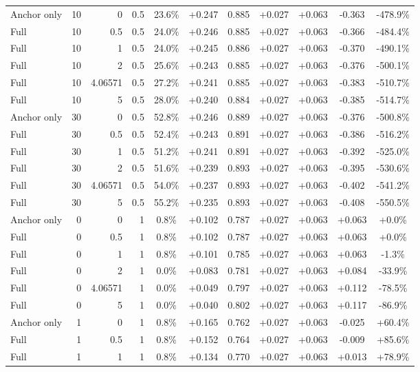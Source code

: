\begin{table}[htbp]
\begin{tabular}{lrrrccccccc}
Anchor only & 10 & 0 & 0.5 & 23.6\% & +0.247 & 0.885 & +0.027 & +0.063 & -0.363 & -478.9\% \\
Full & 10 & 0.5 & 0.5 & 24.0\% & +0.246 & 0.885 & +0.027 & +0.063 & -0.366 & -484.4\% \\
Full & 10 & 1 & 0.5 & 24.0\% & +0.245 & 0.886 & +0.027 & +0.063 & -0.370 & -490.1\% \\
Full & 10 & 2 & 0.5 & 25.6\% & +0.243 & 0.885 & +0.027 & +0.063 & -0.376 & -500.1\% \\
Full & 10 & 4.06571 & 0.5 & 27.2\% & +0.241 & 0.885 & +0.027 & +0.063 & -0.383 & -510.7\% \\
Full & 10 & 5 & 0.5 & 28.0\% & +0.240 & 0.884 & +0.027 & +0.063 & -0.385 & -514.7\% \\
Anchor only & 30 & 0 & 0.5 & 52.8\% & +0.246 & 0.889 & +0.027 & +0.063 & -0.376 & -500.8\% \\
Full & 30 & 0.5 & 0.5 & 52.4\% & +0.243 & 0.891 & +0.027 & +0.063 & -0.386 & -516.2\% \\
Full & 30 & 1 & 0.5 & 51.2\% & +0.241 & 0.891 & +0.027 & +0.063 & -0.392 & -525.0\% \\
Full & 30 & 2 & 0.5 & 51.6\% & +0.239 & 0.893 & +0.027 & +0.063 & -0.395 & -530.6\% \\
Full & 30 & 4.06571 & 0.5 & 54.0\% & +0.237 & 0.893 & +0.027 & +0.063 & -0.402 & -541.2\% \\
Full & 30 & 5 & 0.5 & 55.2\% & +0.235 & 0.893 & +0.027 & +0.063 & -0.408 & -550.5\% \\
Anchor only & 0 & 0 & 1 & 0.8\% & +0.102 & 0.787 & +0.027 & +0.063 & +0.063 & +0.0\% \\
Full & 0 & 0.5 & 1 & 0.8\% & +0.102 & 0.787 & +0.027 & +0.063 & +0.063 & +0.0\% \\
Full & 0 & 1 & 1 & 0.8\% & +0.101 & 0.785 & +0.027 & +0.063 & +0.063 & -1.3\% \\
Full & 0 & 2 & 1 & 0.0\% & +0.083 & 0.781 & +0.027 & +0.063 & +0.084 & -33.9\% \\
Full & 0 & 4.06571 & 1 & 0.0\% & +0.049 & 0.797 & +0.027 & +0.063 & +0.112 & -78.5\% \\
Full & 0 & 5 & 1 & 0.0\% & +0.040 & 0.802 & +0.027 & +0.063 & +0.117 & -86.9\% \\
Anchor only & 1 & 0 & 1 & 0.8\% & +0.165 & 0.762 & +0.027 & +0.063 & -0.025 & +60.4\% \\
Full & 1 & 0.5 & 1 & 0.8\% & +0.152 & 0.764 & +0.027 & +0.063 & -0.009 & +85.6\% \\
Full & 1 & 1 & 1 & 0.8\% & +0.134 & 0.770 & +0.027 & +0.063 & +0.013 & +78.9\% \\

\end{tabular}
\end{table}
